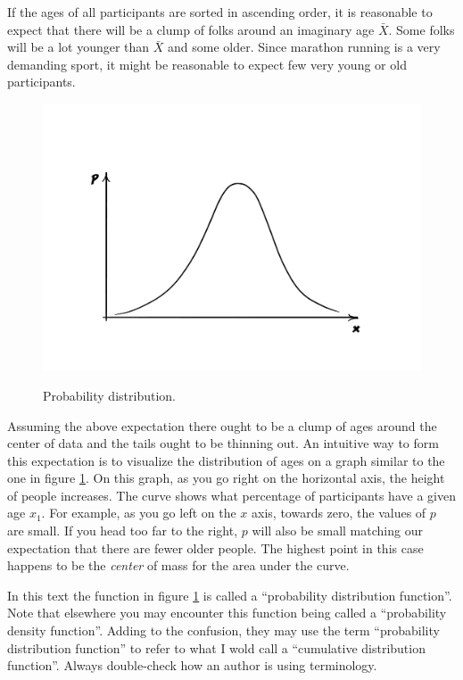 \documentclass{tufte-book} %
\begin{document}
If the ages of all participants are sorted in ascending order, it is reasonable to expect that there will be a clump of folks around an imaginary age $\bar{X}$. Some folks will be a lot younger than $\bar{X}$ and some older. Since marathon running is a very demanding sport, it might be reasonable to expect few very young or old participants.

\begin{figure}
	\centering
	\includegraphics[trim={4cm 3cm 4cm 5cm},clip]{graphics/distribution}
	\label{img:distribution}
	\caption{Probability distribution.}
\end{figure}

Assuming the above expectation there ought to be a clump of ages around the center of data and the tails ought to be thinning out. An intuitive way to form this expectation is to visualize the distribution of ages on a graph similar to the one in figure \ref{img:distribution}. On this graph, as you go right on the horizontal axis, the height of people increases. The curve shows what percentage of participants have a given age $x_1$. For example, as you go left on the $x$ axis, towards zero, the values of $p$ are small. If you head too far to the right, $p$ will also be small matching our expectation that there are fewer older people. The highest point in this case happens to be the {\em center} of mass for the area under the curve. 

\begin{tcolorbox}
	In this text the function in figure \ref{img:distribution} is called a ``probability distribution function''. Note that elsewhere you may encounter this function being called a ``probability density function''. Adding to the confusion, they may use the term ``probability distribution function'' to refer to what I wold call a ``cumulative distribution function''. Always double-check how an author is using terminology.
\end{tcolorbox}
\end{document}
